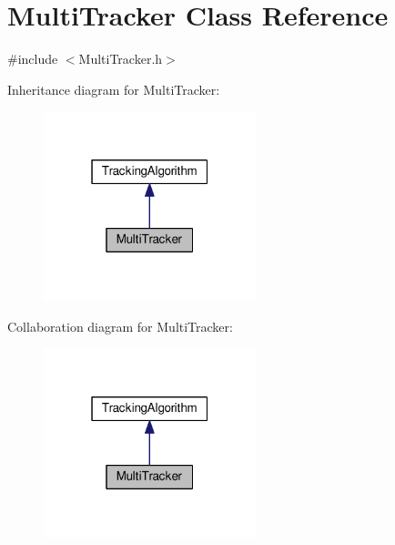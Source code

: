 \hypertarget{class_multi_tracker}{}\section{Multi\+Tracker Class Reference}
\label{class_multi_tracker}


{\ttfamily \#include $<$Multi\+Tracker.\+h$>$}



Inheritance diagram for Multi\+Tracker\+:
\nopagebreak
\begin{figure}[H]
\begin{center}
\leavevmode
\includegraphics[width=175pt]{class_multi_tracker__inherit__graph}
\end{center}
\end{figure}


Collaboration diagram for Multi\+Tracker\+:
\nopagebreak
\begin{figure}[H]
\begin{center}
\leavevmode
\includegraphics[width=175pt]{class_multi_tracker__coll__graph}
\end{center}
\end{figure}
